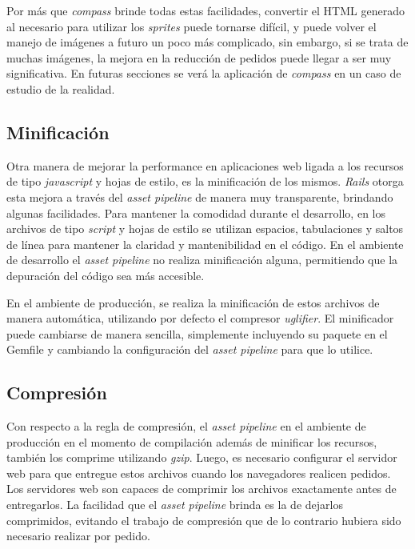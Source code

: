 Por más que \emph{compass} brinde todas estas facilidades, convertir el HTML generado al necesario para utilizar los \emph{sprites} puede tornarse difícil, y puede volver el manejo
de imágenes a futuro un poco más complicado, sin embargo, si se trata de muchas imágenes, la mejora en la reducción de pedidos puede llegar a ser muy significativa.
En futuras secciones se verá la aplicación de \emph{compass} en un caso de estudio de la realidad.

\subsection{Minificación}

Otra manera de mejorar la performance en aplicaciones web ligada a los recursos de tipo \emph{javascript} y hojas de estilo, es la minificación de los mismos.
\emph{Rails} otorga esta mejora a través del \emph{asset pipeline} de manera muy transparente, brindando algunas facilidades. Para mantener la comodidad durante el desarrollo,
en los archivos de tipo \emph{script} y hojas de estilo se utilizan espacios, tabulaciones y saltos de línea para mantener la claridad y mantenibilidad en el código. En el ambiente de
desarrollo el \emph{asset pipeline} no realiza minificación alguna, permitiendo que la depuración del código sea más accesible.

 En el ambiente de producción, se realiza la
minificación de estos archivos de manera automática, utilizando por defecto el compresor \emph{uglifier}. El minificador puede cambiarse de manera sencilla, simplemente incluyendo
su paquete en el Gemfile y cambiando la configuración del \emph{asset pipeline} para que lo utilice.

\subsection{Compresión}
\label{cap4:cumpl_rails:compresion}

Con respecto a la regla de compresión, el \emph{asset pipeline} en el ambiente de producción en el momento de compilación además de minificar los recursos, también los comprime
utilizando \emph{gzip}. Luego, es necesario configurar el servidor web para que entregue estos archivos cuando los navegadores realicen pedidos.
Los servidores web son capaces de comprimir los archivos exactamente antes de entregarlos. La facilidad que el \emph{asset pipeline} brinda es la de dejarlos comprimidos,
evitando el trabajo de compresión que de lo contrario hubiera sido necesario realizar por pedido.

